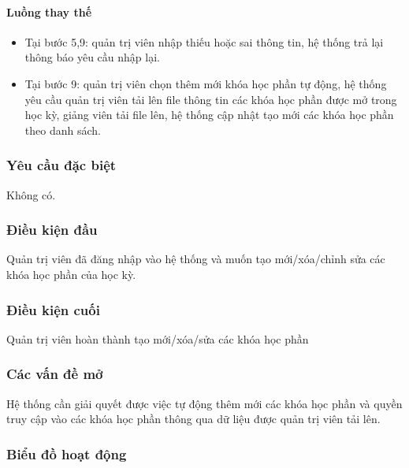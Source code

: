 \documentclass[./../main_file.tex]{subfiles}
\begin{document}
\paragraph{Luồng thay thế}
\begin{itemize}
	\item Tại bước 5,9: quản trị viên nhập thiếu hoặc sai thông tin, hệ thống trả lại thông báo yêu cầu nhập lại.
	\item Tại bước 9: quản trị viên chọn thêm mới khóa học phần tự động, hệ thống yêu cầu quản trị viên tải lên file thông tin các khóa học phần được mở trong học kỳ, giảng viên tải file lên, hệ thống cập nhật tạo mới các khóa học phần theo danh sách.
	
\end{itemize}
\subsubsection{Yêu cầu đặc biệt}
Không có.

\subsubsection{Điều kiện đầu}
Quản trị viên đã đăng nhập vào hệ thống và muốn tạo mới/xóa/chỉnh sửa các khóa học phần của học kỳ.

\subsubsection{Điều kiện cuối}
Quản trị viên hoàn thành tạo mới/xóa/sửa các khóa học phần

\subsubsection{Các vấn đề mở}
Hệ thống cần giải quyết được việc tự động thêm mới các khóa học phần và quyền truy cập vào các khóa học phần thông qua dữ liệu được quản trị viên tải lên.

\subsubsection{Biểu đồ hoạt động}
	
\end{document}
